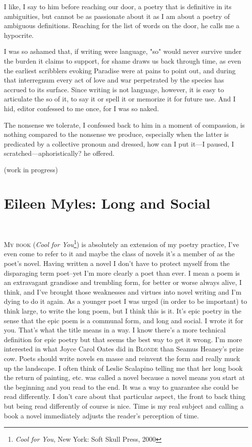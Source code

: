 \documentclass[
]{memoir}
\begin{document}
I like, I say to him before reaching our door, a poetry that is
definitive in its ambiguities, but cannot be as passionate about it as I
am about a poetry of ambiguous definitions. Reaching for the list of
words on the door, he calls me a hypocrite.

I was so ashamed that, if writing were language, "so" would never
survive under the burden it claims to support, for shame draws us back
through time, as even the earliest scribblers evoking Paradise were at
pains to point out, and during that interregnum every act of love and
war perpetrated by the species has accrued to its surface. Since writing
is not language, however, it is easy to articulate the so of it, to say
it or spell it or memorize it for future use. And I hid, editor
confessed to me once, for I was so naked.

The nonsense we tolerate, I confessed back to him in a moment of
compassion, is nothing compared to the nonsense we produce, especially
when the latter is predicated by a collective pronoun and dressed, how
can I put it---I paused, I scratched---aphoristically? he offered.

(work in progress)

\hypertarget{eileen-myles-long-and-social}{%
\chapter{Eileen Myles: Long and
Social}\label{eileen-myles-long-and-social}}

~

\lettrine[lines=3, findent=0em, nindent=0.1em, lhang=0]{M}{y book}
(\emph{Cool for You}\footnote{\emph{Cool for You}, New York: Soft Skull
  Press, 2000}) is absolutely an extension of my poetry practice, I've
even come to refer to it and maybe the class of novels it's a member of
as the poet's novel. Having written a novel I don't have to protect
myself from the disparaging term poet--yet I'm more clearly a poet than
ever. I mean a poem is an extravagant grandiose and trembling form, for
better or worse always alive, I think, and I've brought those weaknesses
and virtues into novel writing and I'm dying to do it again. As a
younger poet I was urged (in order to be important) to think large, to
write the long poem, but I think this is it. It's epic poetry in the
sense that the epic poem is a communal form, and long and social. I
wrote it for you. That's what the title means in a way. I know there's a
more technical definition for epic poetry but that seems the best way to
get it wrong. I'm more interested in what Joyce Carol Oates did in
\textsc{Blonde} than Seamus Heaney's prize cow. Poets should write
novels en masse and reinvent the form and really muck up the landscape.
I often think of Leslie Scalapino telling me that her long book the
return of painting, etc. was called a novel because a novel means you
start at the beginning and you read to the end. It was a way to
guarantee she could be read differently. I don't care about that
particular aspect, the front to back thing but being read differently of
course is nice. Time is my real subject and calling a book a novel
immediately adjusts the reader's perception of time.
\end{document}
